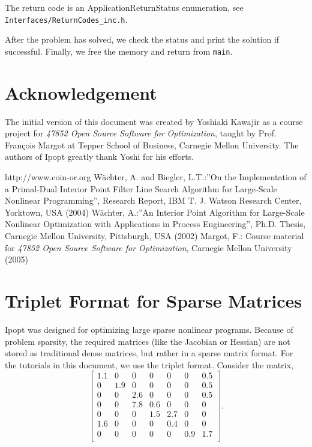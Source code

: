 \documentclass[letter,10pt]{article}
\begin{document}
{The return code is an ApplicationReturnStatus enumeration, see {\tt
Interfaces/ReturnCodes_inc.h}.

After the problem has solved, we check the status and print the solution if 
successful. Finally, we free the memory and return from {\tt main}.

\section*{Acknowledgement}
The initial version of this document was created by Yoshiaki Kawajir
as a course project for \textit{47852 Open Source Software for
Optimization}, taught by Prof. Fran\c cois Margot at Tepper School of
Business, Carnegie Mellon University. The authors of Ipopt greatly
thank Yoshi for his efforts.

\begin{thebibliography}{99}
http://www.coin-or.org
W\"achter, A. and Biegler, L.T.:''On the Implementation of a Primal-Dual
        Interior Point Filter Line Search Algorithm for Large-Scale
        Nonlinear Programming'', Research Report, IBM T. J. Watson
        Research Center, Yorktown, USA (2004)
W\"achter, A.:''An Interior Point Algorithm for Large-Scale Nonlinear
        Optimization with Applications in Process Engineering'',
        Ph.D. Thesis, Carnegie Mellon University, Pittsburgh, USA (2002)
Margot, F.: Course material for \textit{47852 Open Source Software for
        Optimization}, Carnegie Mellon University (2005)
\end{thebibliography}


\appendix
\section{Triplet Format for Sparse Matrices}\label{app.triplet}
Ipopt was designed for optimizing large sparse nonlinear programs. 
Because of problem sparsity, the required matrices (like the Jacobian or Hessian) are not stored as traditional dense matrices, but rather in a sparse matrix format. For the tutorials in this document, we use the triplet format. 
Consider the matrix,
\[
\left[
\begin{array}{ccccccc}
1.1     & 0             & 0             & 0             & 0             & 0             & 0.5 \\
0       & 1.9   & 0             & 0             & 0             & 0             & 0.5 \\
0       & 0             & 2.6   & 0             & 0             & 0             & 0.5 \\
0       & 0             & 7.8   & 0.6   & 0             & 0             & 0    \\
0       & 0             & 0             & 1.5   & 2.7   & 0             & 0     \\
1.6     & 0             & 0             & 0             & 0.4   & 0             & 0     \\
0       & 0             & 0             & 0             & 0             & 0.9   & 1.7 \\
\end{array}
\right].
\]

}
\end{document}
